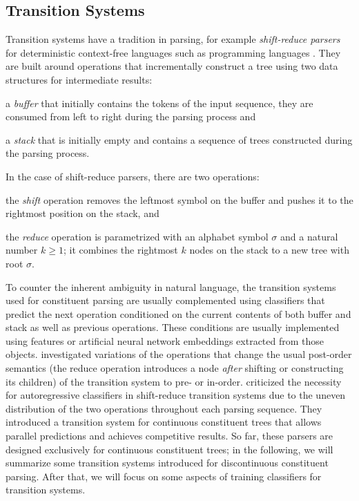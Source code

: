 \documentclass[../document.tex]{subfiles}
\begin{document}
    \subsection{Transition Systems}\label{sec:literature:transition}
    Transition systems have a tradition in parsing, for example \emph{shift-reduce parsers} for deterministic context-free languages such as programming languages \citep[Section~4.6]{aho2020compilers}.
    They are built around operations that incrementally construct a tree using two data structures for intermediate results:
    \begin{compactitem}
        \item a \emph{buffer} that initially contains the tokens of the input sequence, they are consumed from left to right during the parsing process and
        \item a \emph{stack} that is initially empty and contains a sequence of trees constructed during the parsing process.
    \end{compactitem}
    In the case of shift-reduce parsers, there are two operations:
    \begin{compactitem}
        \item the \emph{shift} operation removes the leftmost symbol on the buffer and pushes it to the rightmost position on the stack, and
        \item the \emph{reduce} operation is parametrized with an alphabet symbol \(\sigma\) and a natural number \(k \ge 1\); it combines the rightmost \(k\) nodes on the stack to a new tree with root \(\sigma\).
    \end{compactitem}
    To counter the inherent ambiguity in natural language, the transition systems used for constituent parsing are usually complemented using classifiers that predict the next operation conditioned on the current contents of both buffer and stack as well as previous operations.
    These conditions are usually implemented using features or artificial neural network embeddings extracted from those objects.
     investigated variations of the operations that change the usual post-order semantics (the reduce operation introduces a node \emph{after} shifting or constructing its children) of the transition system to pre- or in-order.
     criticized the necessity for autoregressive classifiers in shift-reduce transition systems due to the uneven distribution of the two operations throughout each parsing sequence.
    They introduced a transition system for continuous constituent trees that allows parallel predictions and achieves competitive results.
    So far, these parsers are designed exclusively for continuous constituent trees; in the following, we will summarize some transition systems introduced for discontinuous constituent parsing.
    After that, we will focus on some aspects of training classifiers for transition systems.
\end{document}
